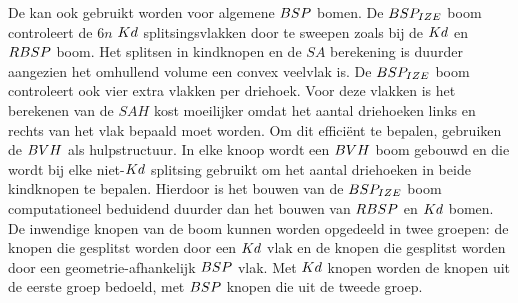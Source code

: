     De \symSAH{} kan ook gebruikt worden voor algemene $BSP$ bomen. De $BSP_{IZE}$ boom controleert de $6n$ $Kd$ splitsingsvlakken door te sweepen zoals bij de $Kd$ en $RBSP$ boom. Het splitsen in kindknopen en de $SA$ berekening is duurder aangezien het omhullend volume een convex veelvlak is. 
    De $BSP_{IZE}$ boom controleert ook vier extra vlakken per driehoek. 
    Voor deze vlakken is het berekenen van de $SAH$ kost moeilijker omdat het aantal driehoeken links en rechts van het vlak bepaald moet worden. 
    Om dit efficiënt te bepalen, gebruiken \authorIze{} \cite{ize} de $BVH$ als hulpstructuur. 
    In elke knoop wordt een $BVH$ boom gebouwd en die wordt bij elke niet-$Kd$ splitsing gebruikt om het aantal driehoeken in beide kindknopen te bepalen.
    Hierdoor is het bouwen van de $BSP_{IZE}$ boom computationeel beduidend duurder dan het bouwen van $RBSP$ en $Kd$ bomen. 
    De inwendige knopen van de boom kunnen worden opgedeeld in twee groepen: de knopen die gesplitst worden door een $Kd$ vlak en de knopen die gesplitst worden door een geometrie-afhankelijk $BSP$ vlak.
    Met $Kd$ knopen worden de knopen uit de eerste groep bedoeld, met $BSP$ knopen die uit de tweede groep.\\

